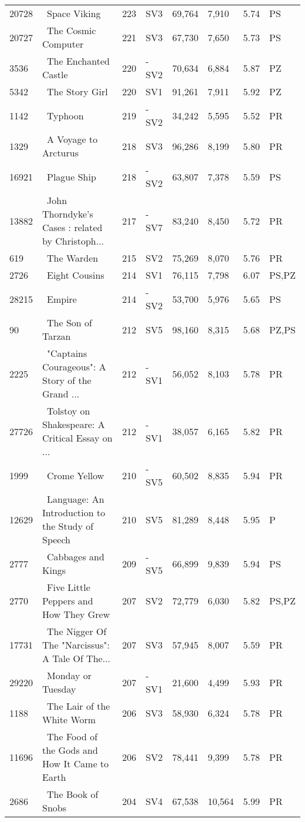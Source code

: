 \begin{longtable}{l | l | l | l | l | l | l | l}
20728 & ~Space Viking & 223 & SV3 & 69,764 & 7,910 & 5.74 & PS\\
20727 & ~The Cosmic Computer & 221 & SV3 & 67,730 & 7,650 & 5.73 & PS\\
3536 & ~The Enchanted Castle & 220 & -SV2 & 70,634 & 6,884 & 5.87 & PZ\\
5342 & ~The Story Girl & 220 & SV1 & 91,261 & 7,911 & 5.92 & PZ\\
1142 & ~Typhoon & 219 & -SV2 & 34,242 & 5,595 & 5.52 & PR\\
1329 & ~A Voyage to Arcturus & 218 & SV3 & 96,286 & 8,199 & 5.80 & PR\\
16921 & ~Plague Ship & 218 & -SV2 & 63,807 & 7,378 & 5.59 & PS\\
13882 & ~John Thorndyke's Cases
: related by Christoph... & 217 & -SV7 & 83,240 & 8,450 & 5.72 & PR\\
619 & ~The Warden & 215 & SV2 & 75,269 & 8,070 & 5.76 & PR\\
2726 & ~Eight Cousins & 214 & SV1 & 76,115 & 7,798 & 6.07 & PS,PZ\\
28215 & ~Empire & 214 & -SV2 & 53,700 & 5,976 & 5.65 & PS\\
90 & ~The Son of Tarzan & 212 & SV5 & 98,160 & 8,315 & 5.68 & PZ,PS\\
2225 & ~"Captains Courageous": A Story of the Grand ... & 212 & -SV1 & 56,052 & 8,103 & 5.78 & PR\\
27726 & ~Tolstoy on Shakespeare: A Critical Essay on ... & 212 & -SV1 & 38,057 & 6,165 & 5.82 & PR\\
1999 & ~Crome Yellow & 210 & -SV5 & 60,502 & 8,835 & 5.94 & PR\\
12629 & ~Language: An Introduction to the Study of Speech & 210 & SV5 & 81,289 & 8,448 & 5.95 & P\\
2777 & ~Cabbages and Kings & 209 & -SV5 & 66,899 & 9,839 & 5.94 & PS\\
2770 & ~Five Little Peppers and How They Grew & 207 & SV2 & 72,779 & 6,030 & 5.82 & PS,PZ\\
17731 & ~The Nigger Of The "Narcissus": A Tale Of The... & 207 & SV3 & 57,945 & 8,007 & 5.59 & PR\\
29220 & ~Monday or Tuesday & 207 & -SV1 & 21,600 & 4,499 & 5.93 & PR\\
1188 & ~The Lair of the White Worm & 206 & SV3 & 58,930 & 6,324 & 5.78 & PR\\
11696 & ~The Food of the Gods and How It Came to Earth & 206 & SV2 & 78,441 & 9,399 & 5.78 & PR\\
2686 & ~The Book of Snobs & 204 & SV4 & 67,538 & 10,564 & 5.99 & PR\\

\end{longtable}
